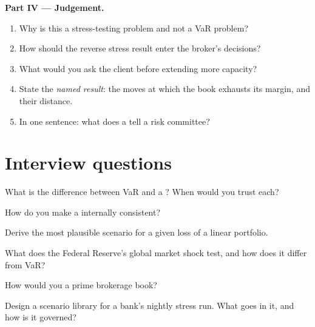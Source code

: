 \begin{problem}
\medskip\noindent\textbf{Part IV --- Judgement.}
\begin{enumerate}[resume]
\item Why is this a stress-testing problem and not a VaR problem?
\item How should the reverse stress result enter the broker's decisions?
\item What would you ask the client before extending more capacity?
\item State the \emph{named result}: the moves at which the book exhausts its margin, and their
distance.
\item In one sentence: what does a  tell a risk committee?
\end{enumerate}
\end{problem}

\section{Interview questions}

\begin{interviewq}\label{iq:rc:stress-testing-and-scenarios:1}
What is the difference between VaR and a ? When would you trust each?
\end{interviewq}

\begin{interviewq}\label{iq:rc:stress-testing-and-scenarios:2}
How do you make a  internally consistent?
\end{interviewq}

\begin{interviewq}\label{iq:rc:stress-testing-and-scenarios:3}
Derive the most plausible scenario for a given loss of a linear portfolio.
\end{interviewq}

\begin{interviewq}\label{iq:rc:stress-testing-and-scenarios:4}
What does the Federal Reserve's global market shock test, and how does it differ from VaR?
\end{interviewq}

\begin{interviewq}\label{iq:rc:stress-testing-and-scenarios:5}
How would you  a prime brokerage book?
\end{interviewq}

\begin{interviewq}\label{iq:rc:stress-testing-and-scenarios:6}
Design a scenario library for a bank's nightly stress run. What goes in it, and how is it
governed?
\end{interviewq}

